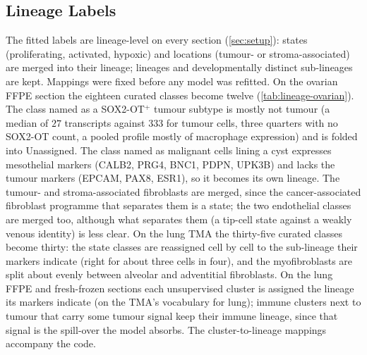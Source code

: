 \subsection{Lineage Labels}
\label{app:lineage}

The fitted labels are lineage-level on every section (\cref{sec:setup}): states (proliferating, activated, hypoxic) and locations (tumour- or stroma-associated) are merged into their lineage; lineages and developmentally distinct sub-lineages are kept. Mappings were fixed before any model was refitted. On the ovarian FFPE section the eighteen curated classes become twelve (\cref{tab:lineage-ovarian}). The class named as a SOX2-OT$^+$ tumour subtype is mostly not tumour (a median of $27$ transcripts against $333$ for tumour cells, three quarters with no SOX2-OT count, a pooled profile mostly of macrophage expression) and is folded into Unassigned. The class named as malignant cells lining a cyst expresses mesothelial markers (CALB2, PRG4, BNC1, PDPN, UPK3B) and lacks the tumour markers (EPCAM, PAX8, ESR1), so it becomes its own lineage. The tumour- and stroma-associated fibroblasts are merged, since the cancer-associated fibroblast programme that separates them is a state; the two endothelial classes are merged too, although what separates them (a tip-cell state against a weakly venous identity) is less clear. On the lung TMA the thirty-five curated classes become thirty: the state classes are reassigned cell by cell to the sub-lineage their markers indicate (right for about three cells in four), and the myofibroblasts are split about evenly between alveolar and adventitial fibroblasts. On the lung FFPE and fresh-frozen sections each unsupervised cluster is assigned the lineage its markers indicate (on the TMA's vocabulary for lung); immune clusters next to tumour that carry some tumour signal keep their immune lineage, since that signal is the spill-over the model absorbs. The cluster-to-lineage mappings accompany the code.

